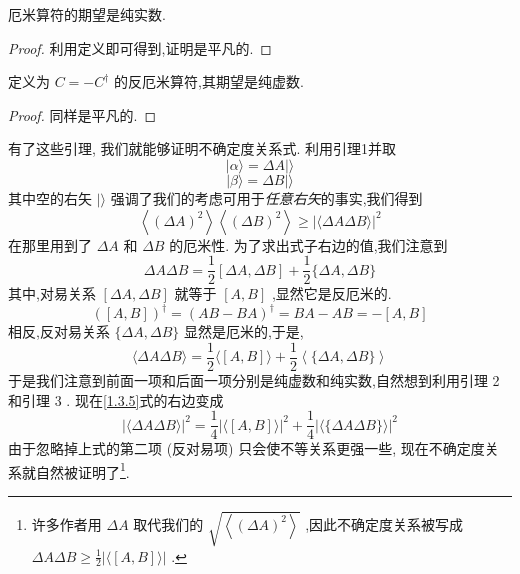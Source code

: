 \documentclass[lang=cn,newtx,10pt,scheme=chinese,thmcnt=section]{elegantbook}
\begin{document}
\begin{lemma}\label{lem:1.2}
	厄米算符的期望是纯实数.
\end{lemma}
\begin{proof}
	利用定义即可得到,证明是平凡的.
\end{proof}
\begin{lemma}\label{lem:1.3}
	定义为 $C = - {C}^{ \dagger }$ 的反厄米算符,其期望是纯虚数.
\end{lemma}
\begin{proof}
	同样是平凡的.
\end{proof}
有了这些引理, 我们就能够证明不确定度关系式. 利用引理1并取
\begin{equation}
	\left| {\alpha \rangle = {\Delta A}}\right| \rangle
\end{equation}
\begin{equation}
	\left| {\beta \rangle = {\Delta B}}\right| \rangle
\end{equation}
其中空的右矢 $|\rangle$ 强调了我们的考虑可用于\textit{任意右矢}的事实,我们得到
\begin{equation}\label{1.3.5}
	\left\langle {\left( \Delta A\right) }^{2}\right\rangle \left\langle {\left( \Delta B\right) }^{2}\right\rangle \geq {\left| \langle \Delta A\Delta B\rangle \right| }^{2}
\end{equation}
在那里用到了 ${\Delta A}$ 和 ${\Delta B}$ 的厄米性. 为了求出式子右边的值,我们注意到
\begin{equation}
	{\Delta A\Delta B} = \frac{1}{2}\left\lbrack {{\Delta A},{\Delta B}}\right\rbrack + \frac{1}{2}\{ {\Delta A},{\Delta B}\}
\end{equation}
其中,对易关系 $\left\lbrack {{\Delta A},{\Delta B}}\right\rbrack$ 就等于 $\left\lbrack {A, B}\right\rbrack$ ,显然它是反厄米的.
\begin{equation}
	{\left( \left\lbrack A, B\right\rbrack \right) }^{\dagger} = {\left( AB - BA\right) }^{\dagger} = {BA} - {AB} = - \left\lbrack {A, B}\right\rbrack
\end{equation}
相反,反对易关系 $\{ {\Delta A},{\Delta B}\}$ 显然是厄米的,于是,
\begin{equation}
	\langle {\Delta A\Delta B}\rangle = \frac{1}{2}\langle \left\lbrack {A, B}\right\rbrack \rangle + \frac{1}{2}\left\langle {\{ {\Delta A},{\Delta B}\} }\right\rangle
\end{equation}
于是我们注意到前面一项和后面一项分别是纯虚数和纯实数,自然想到利用引理 2 和引理 3 . 现在\ref{1.3.5}式的右边变成
\begin{equation}
	{\left| \langle \Delta A\Delta B\rangle \right| }^{2} = \frac{1}{4}{\left| \langle \left\lbrack A, B\right\rbrack \rangle \right| }^{2} + \frac{1}{4}{\left| \langle \{ \Delta A\Delta B\} \rangle \right| }^{2}
\end{equation}
由于忽略掉上式的第二项 (反对易项) 只会使不等关系更强一些, 现在不确定度关系就自然被证明了\footnote{许多作者用 ${\Delta A}$ 取代我们的 $\sqrt{\left\langle {\left( \Delta A\right) }^{2}\right\rangle }$ ,因此不确定度关系被写成 ${\Delta A\Delta B} \geq \frac{1}{2}\left| {\langle \left\lbrack {A, B}\right\rbrack \rangle }\right|$ .}.
\end{document}
